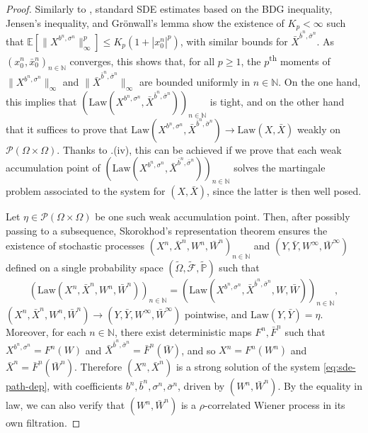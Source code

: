 \documentclass[oneside]{amsart}
\theoremstyle{definition}
\newcommand{\Law}{\mathrm{Law}}
\newcommand{\N}{\mathbb N}
\newcommand{\Pc}{\mathcal P}
\def\E{{\mathbb E}}
\numberwithin{equation}{section}
\begin{document}
\begin{proof}
Similarly to , standard SDE estimates based on the BDG inequality, Jensen's inequality, and Gr\"onwall's lemma show the existence of $K_p<\infty$ such that $\E[\|X^{b^n, \sigma^n}\|_\infty^p]\leq K_p(1+|x^n_0|^p) $, with similar bounds for $\bar{X}^{\bar{b}^n, \bar{\sigma}^n}$. As $(x^n_0,\bar x^n_0)_{n \in \N}$ converges, this shows that, for all $p \ge 1$, the $p$\textsuperscript{th} moments of $\|X^{b^n, \sigma^n}\|_\infty$ and $\|\bar{X}^{\bar{b}^n, \bar{\sigma}^n}\|_\infty$ are bounded uniformly in $n\in \N$. On the one hand, this implies that $(\Law(X^{b^n, \sigma^n},\bar{X}^{\bar{b}^n, \bar{\sigma}^n}))_{n \in \N}$ is tight, and on the other hand that it suffices to prove that $\Law(X^{b^n, \sigma^n},\bar{X}^{\bar{b}^n, \bar{\sigma}^n}) \to \Law(X,\bar X)$ weakly on $\Pc(\Omega \times \Omega)$. Thanks to .(iv), this can be achieved if we prove that each weak accumulation point of $(\Law(X^{b^n, \sigma^n},\bar{X}^{\bar{b}^n, \bar{\sigma}^n}))_{n \in \N}$ solves the martingale problem associated to the system for $(X,\bar X)$, since the latter is then well posed.

Let $\eta \in \Pc(\Omega \times \Omega)$ be one such weak accumulation point. Then, after possibly passing to a subsequence, Skorokhod's representation theorem ensures the existence of stochastic processes $(X^n,\bar X^n,W^n,\bar W^n)_{n \in \N}$ and $(Y, \bar Y, W^\infty, \bar W^\infty)$ defined on a single probability space $(\tilde{\Omega}, \tilde{\mathcal F}, \tilde{\mathbb P})$ such that
	\begin{equation}
		(\Law (X^n,\bar X^n,W^n,\bar W^n))_{n \in \N} = (\Law(X^{b^n, \sigma^n}, \bar{X}^{\bar{b}^n, \bar{\sigma}^n}, W, \bar W))_{n \in \N},	
	\end{equation}
	$(X^n,\bar X^n,W^n,\bar W^n)\to(Y,\bar Y,W^{\infty},\bar W^\infty)$ pointwise, and $\Law(Y, \bar Y) = \eta$. Moreover, for each $n \in \N$, there exist deterministic maps $F^n, \bar{F}^n$ such that $X^{b^n, \sigma^n} = F^n(W)$ and $\bar{X}^{\bar{b}^n, \bar{\sigma}^n} = \bar{F}^n(\bar{W})$, and so $X^n = F^n(W^n)$ and $\bar{X}^n = \bar{F}^n(\bar{W}^n)$. Therefore $(X^n, \bar{X}^n)$ is a strong solution of the system \eqref{eq:sde-path-dep}, with coefficients $b^n, \bar b^n, \sigma^n, \bar \sigma^n$, driven by $(W^n, \bar W^n)$.
By the equality in law, we can also verify that $(W^n,\bar W^n)$ is a $\rho$-correlated Wiener process in its own filtration.


\end{proof}
\end{document}
